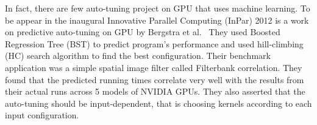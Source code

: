 In fact, there are few auto-tuning project on GPU that uses machine learning. To be appear in the inaugural Innovative Parallel Computing (InPar) 2012 is a work on predictive auto-tuning on GPU by Bergstra et al.\ \cite{inpar2012} They used Boosted Regression Tree (BST) to predict program's performance and used hill-climbing (HC) search algorithm to find the best configuration. Their benchmark application was a simple spatial image filter called Filterbank correlation. They found that the predicted running times correlate very well with the results from their actual runs across 5 models of NVIDIA GPUs. They also asserted that the auto-tuning should be input-dependent, that is choosing kernels according to each input configuration.

